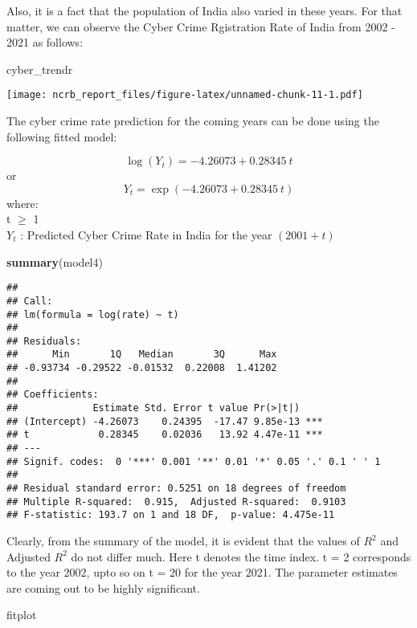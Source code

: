 \documentclass[
  12,
  a4paper,
]{report}
\newenvironment{Shaded}{\begin{snugshade}}{\end{snugshade}}
\newcommand{\FunctionTok}[1]{\textcolor[rgb]{0.13,0.29,0.53}{\textbf{#1}}}
\newcommand{\NormalTok}[1]{#1}
\begin{document}
Also, it is a fact that the population of India also varied in these
years. For that matter, we can observe the Cyber Crime Rgistration Rate
of India from 2002 - 2021 as follows:

\begin{Shaded}
\begin{Highlighting}[]
\NormalTok{cyber\_trendr}
\end{Highlighting}
\end{Shaded}

\texttt{[image: ncrb\_report\_files/figure-latex/unnamed-chunk-11-1.pdf]}

The cyber crime rate prediction for the coming years can be done using
the following fitted model:

\[\log(Y_t) = -4.26073 + 0.28345 \ t\] or
\[Y_t = \exp(-4.26073 + 0.28345 \ t)\] where:\\
t \(\geq\) 1\\
\(Y_t\) : Predicted Cyber Crime Rate in India for the year
\((2001 + t)\)

\begin{Shaded}
\begin{Highlighting}[]
\FunctionTok{summary}\NormalTok{(model4)}
\end{Highlighting}
\end{Shaded}

\begin{verbatim}
## 
## Call:
## lm(formula = log(rate) ~ t)
## 
## Residuals:
##      Min       1Q   Median       3Q      Max 
## -0.93734 -0.29522 -0.01532  0.22008  1.41202 
## 
## Coefficients:
##             Estimate Std. Error t value Pr(>|t|)    
## (Intercept) -4.26073    0.24395  -17.47 9.85e-13 ***
## t            0.28345    0.02036   13.92 4.47e-11 ***
## ---
## Signif. codes:  0 '***' 0.001 '**' 0.01 '*' 0.05 '.' 0.1 ' ' 1
## 
## Residual standard error: 0.5251 on 18 degrees of freedom
## Multiple R-squared:  0.915,  Adjusted R-squared:  0.9103 
## F-statistic: 193.7 on 1 and 18 DF,  p-value: 4.475e-11
\end{verbatim}

Clearly, from the summary of the model, it is evident that the values of
\(R^2\) and Adjusted \(R^2\) do not differ much. Here t denotes the time
index. t = 2 corresponds to the year 2002, upto so on t = 20 for the
year 2021. The parameter estimates are coming out to be highly
significant.

\begin{Shaded}
\begin{Highlighting}[]
\NormalTok{fitplot}
\end{Highlighting}
\end{Shaded}
\end{document}
